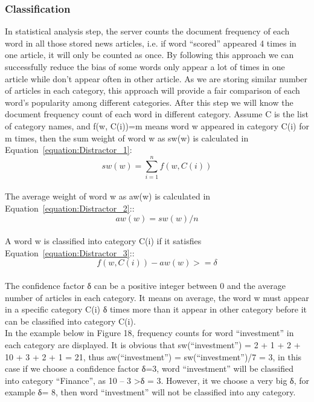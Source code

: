 \subsubsection{Classification}
In statistical analysis step, the server counts the document frequency of each word in all those stored news articles, i.e. if word “scored” appeared 4 times in one article, it will only be counted as once. By following this approach we can successfully reduce the bias of some words only appear a lot of times in one article while don’t appear often in other article. As we are storing similar number of articles in each category, this approach will provide a fair comparison of each word’s popularity among different categories. After this step we will know the document frequency count of each word in different category. 
Assume C is the list of category names, and f(w, C(i))=m means word w appeared in category C(i) for m times, then the sum weight of word w as sw(w) is calculated in Equation~\ref{equation:Distractor_1}:
\\
\begin{equation}
sw (w) = \sum_{i=1}^{n} f(w,C(i))
\label{equation:Distractor_1}
\end{equation}  
\\
The average weight of word w as aw(w) is calculated in Equation~\ref{equation:Distractor_2}::
\\
\begin{equation}
aw (w) = sw (w)/n 
\label{equation:Distractor_2} 
\end{equation}  
\\
A word w is classified into category C(i) if it satisfies Equation~\ref{equation:Distractor_3}::
\\
\begin{equation}
f (w, C(i)) - aw(w) >= \delta
\label{equation:Distractor_3} 
\end{equation}  
\\
The confidence factor δ can be a positive integer between 0 and the average number of articles in each category. It means on average, the word w must appear in a specific category C(i) δ times more than it appear in other category before it can be classified into category C(i).
\\
In the example below in Figure 18, frequency counts for word “investment” in each category are displayed. It is obvious that sw(“investment”) = 2 + 1 + 2 + 10 + 3 + 2 + 1 = 21, thus aw(“investment”) = sw(“investment”)/7 = 3, in this case if we choose a confidence factor δ=3, word “investment” will be classified into category “Finance”, as 10 – 3 \textgreater δ = 3. However, it we choose a very big δ, for example δ= 8, then word “investment” will not be classified into any category.
